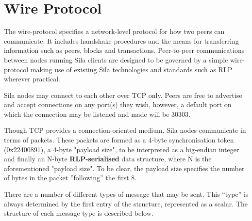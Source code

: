 \section{Wire Protocol}\label{app:wire}
The wire-protocol specifies a network-level protocol for how two peers can communicate. It includes handshake procedures and the means for transferring information such as peers, blocks and transactions. Peer-to-peer communications between nodes running Sila clients are designed to be governed by a simple wire-protocol making use of existing Sila technologies and standards such as RLP wherever practical.

Sila nodes may connect to each other over TCP only. Peers are free to advertise and accept connections on any port(s) they wish, however, a default port on which the connection may be listened and made will be 30303.

Though TCP provides a connection-oriented medium, Sila nodes communicate in terms of packets. These packets are formed as a 4-byte synchronisation token (0x22400891), a 4-byte "payload size", to be interpreted as a big-endian integer and finally an N-byte \textbf{RLP-serialised} data structure, where N is the aforementioned "payload size". To be clear, the payload size specifies the number of bytes in the packet ''following'' the first 8.

There are a number of different types of message that may be sent. This ``type'' is always determined by the first entry of the structure, represented as a scalar. The structure of each message type is described below.

